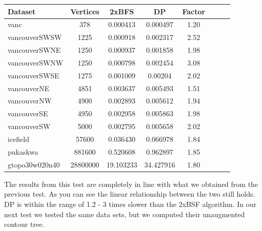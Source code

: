 \begin{center}
\begin{tabular}{l*{6}{c}r}

Dataset            & Vertices        & 2xBFS              & DP                   & Factor \\
\hline
vanc	           & 378	         &0.000413	          & 0.000497	         &1.20    \\
vancouverSWSW	   & 1225	         &0.000918	          & 0.002317	         &2.52    \\
vancouverSWNE	   & 1250	         &0.000937	          & 0.001858	         &1.98    \\
vancouverSWNW	   & 1250	         &0.000798	          & 0.002454	         &3.08    \\
vancouverSWSE	   & 1275	         &0.001009	          & 0.00204	             &2.02    \\
vancouverNE	       & 4851	         &0.003637	          & 0.005493	         &1.51    \\
vancouverNW	       & 4900	         &0.002893	          & 0.005612	         &1.94    \\
vancouverSE	       & 4950	         &0.002958	          & 0.005863	         &1.98    \\
vancouverSW	       & 5000	         &0.002795	          & 0.005658	         &2.02    \\
icefield	       & 57600	         &0.036430	          & 0.066978	         &1.84    \\
pukaskwa	       & 881600	         &0.520608	          & 0.962897	         &1.85    \\
gtopo30w020n40	   & 28800000	     &19.103233	          & 34.427916	         &1.80    \\

\end{tabular}
\end{center}

The results from this test are completely in line with what we obtained from the previous test. As you can see the linear relationship between the two still holds. DP is within the range of 1.2 - 3 times slower than the 2xBSF algorithm. In our next test we tested the same data sets, but we computed their unaugmented contour tree.


